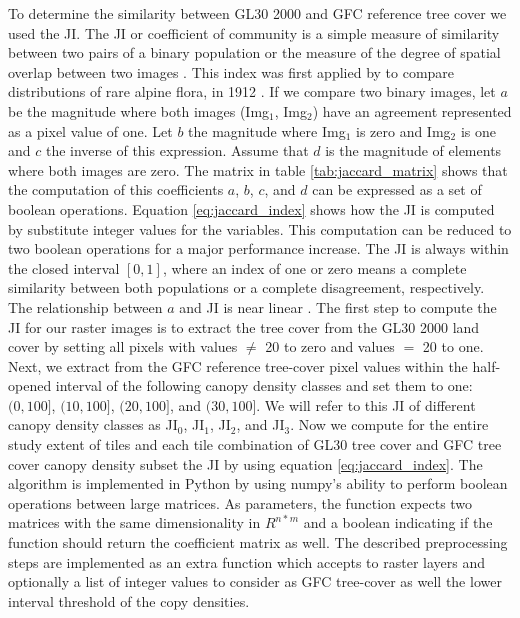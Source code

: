 			To determine the similarity between \ac{GL30} 2000 and \ac{GFC} reference tree cover we used the \ac{JI}. The \ac{JI} or coefficient of community is a simple measure of similarity between two pairs of a binary population or the measure of the degree of spatial overlap between two images \citep{Sampat2009}. This index was first applied by \citeauthor{Jaccard1912} to compare distributions of rare alpine flora, in 1912 \citep{Jaccard1912}. If we compare two binary images, let $a$ be the magnitude where both images (Img$_1$, Img$_2$) have an agreement represented as a pixel value of one. Let $b$ the magnitude where Img$_1$ is zero and Img$_2$ is one and $c$ the inverse of this expression. Assume that $d$ is the magnitude of elements where both images are zero. The matrix in table \ref{tab:jaccard_matrix} shows that the computation of this coefficients $a$, $b$, $c$, and $d$ can be expressed as a set of boolean operations. Equation \ref{eq:jaccard_index} shows how the \ac{JI} is computed by substitute integer values for the variables. This computation can be reduced to two boolean operations for a major performance increase. The \ac{JI} is always within the closed interval $[0,1]$, where an index of one or zero means a complete similarity between both populations or a complete disagreement, respectively. The relationship between $a$ and \ac{JI} is near linear \citep{Shi1993}. The first step to compute the \ac{JI} for our raster images is to extract the tree cover from the \ac{GL30} 2000 land cover by setting all pixels with values $\neq$ 20 to zero and values $=$ 20 to one. Next, we extract from the \ac{GFC} reference tree-cover pixel values within the half-opened interval of the following canopy density classes and set them to one: $(0,100]$, $(10,100]$, $(20,100]$, and $(30,100]$. We will refer to this \ac{JI} of different canopy density classes as JI$_0$, JI$_1$, JI$_2$, and JI$_3$. Now we compute for the entire study extent of  tiles and each tile combination of \ac{GL30} tree cover and \ac{GFC} tree cover canopy density subset the \ac{JI} by using equation \ref{eq:jaccard_index}. The algorithm is implemented in Python by using numpy's ability to perform boolean operations between large matrices. As parameters, the function expects two matrices with the same dimensionality in $R^{n*m}$ and a boolean indicating if the function should return the coefficient matrix as well. The described preprocessing steps are implemented as an extra function which accepts to raster layers and optionally a list of integer values to consider as \ac{GFC} tree-cover as well the lower interval threshold of the copy densities.
